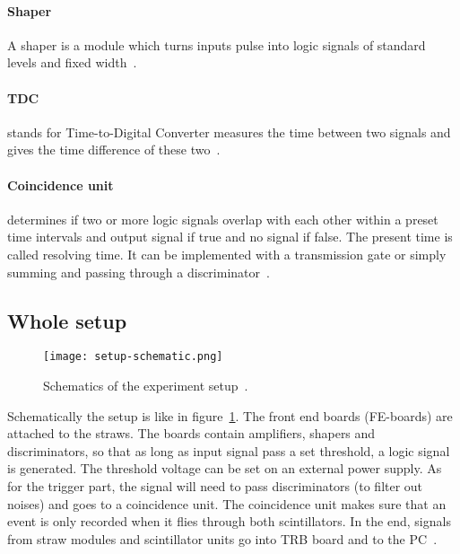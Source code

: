\paragraph{Shaper}
A shaper is a module which turns inputs pulse into logic signals of standard levels and fixed width~\cite{leo}.

\paragraph{TDC}
stands for Time-to-Digital Converter measures the time between two signals and gives the time difference of these two~\cite{leo}.

\paragraph{Coincidence unit}
determines if two or more logic signals overlap with each other within a preset time intervals and output signal if true and no signal if false. The present time is called resolving time. It can be implemented with a transmission gate or simply summing and passing through a discriminator~\cite{leo}.

\subsection{Whole setup}
\begin{figure}[ht]
	\centering
	\texttt{[image: setup-schematic.png]}
	\caption{Schematics of the experiment setup~\cite{manual}.}%
	\label{fig:setup}
\end{figure}
Schematically the setup is like in figure~\ref{fig:setup}. The front end boards (FE-boards) are attached to the straws. The boards contain amplifiers, shapers and discriminators, so that as long as input signal pass a set threshold, a logic signal is generated. The threshold voltage can be set on an external power supply. As for the trigger part, the signal will need to pass discriminators (to filter out noises) and goes to a coincidence unit. The coincidence unit makes sure that an event is only recorded when it flies through both scintillators. In the end, signals from straw modules and scintillator units go into TRB board and to the PC~\cite{manual}.
